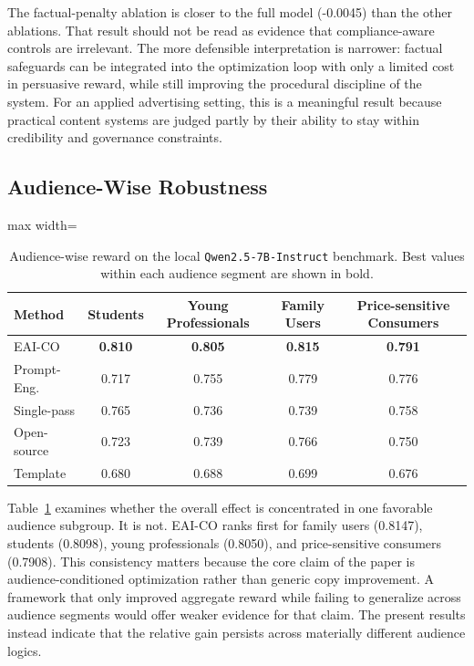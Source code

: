 \documentclass[applsci,article,submit,pdftex,moreauthors]{Definitions/mdpi}
\newcommand{\SummaryTableStyle}{\small\setlength{\tabcolsep}{7pt}\renewcommand{\arraystretch}{1.24}}
\begin{document}
The factual-penalty ablation is closer to the full model (-0.0045) than the other ablations. That result should not be read as evidence that compliance-aware controls are irrelevant. The more defensible interpretation is narrower: factual safeguards can be integrated into the optimization loop with only a limited cost in persuasive reward, while still improving the procedural discipline of the system. For an applied advertising setting, this is a meaningful result because practical content systems are judged partly by their ability to stay within credibility and governance constraints.

\subsection{Audience-Wise Robustness}

\begin{table}[H]
\caption{Audience-wise reward on the local \texttt{Qwen2.5-7B-Instruct} benchmark. Best values within each audience segment are shown in bold.}
\label{tab:qwen_audience}
\centering
\SummaryTableStyle
{}
\begin{adjustbox}{max width=\textwidth}
\begin{tabular}{lcccc}
\toprule
\rowcolor{tableheader}
Method & Students & Young Professionals & Family Users & Price-sensitive Consumers \\
\midrule
\rowcolor{oursrow}
EAI-CO & \textbf{0.810} & \textbf{0.805} & \textbf{0.815} & \textbf{0.791} \\
Prompt-Eng. & 0.717 & 0.755 & 0.779 & 0.776 \\
Single-pass & 0.765 & 0.736 & 0.739 & 0.758 \\
Open-source & 0.723 & 0.739 & 0.766 & 0.750 \\
Template & 0.680 & 0.688 & 0.699 & 0.676 \\
\bottomrule
\end{tabular}
\end{adjustbox}
\end{table}

Table~\ref{tab:qwen_audience} examines whether the overall effect is concentrated in one favorable audience subgroup. It is not. EAI-CO ranks first for family users (0.8147), students (0.8098), young professionals (0.8050), and price-sensitive consumers (0.7908). This consistency matters because the core claim of the paper is audience-conditioned optimization rather than generic copy improvement. A framework that only improved aggregate reward while failing to generalize across audience segments would offer weaker evidence for that claim. The present results instead indicate that the relative gain persists across materially different audience logics.
\end{document}
